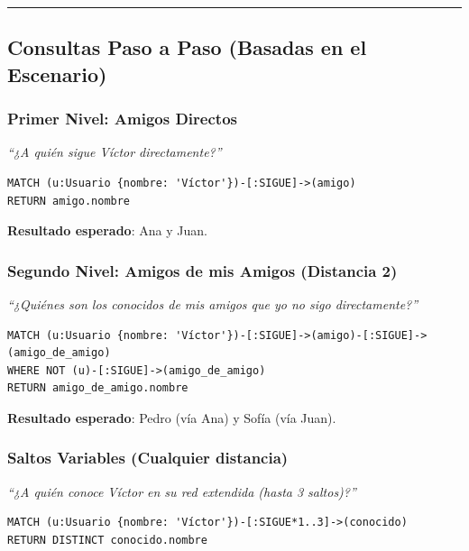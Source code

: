 \documentclass[12pt,a4paper]{article}
\begin{document}
\begin{center}\rule{0.5\linewidth}{0.5pt}\end{center}

\subsection{Consultas Paso a Paso (Basadas en el Escenario)}\label{consultas-paso-a-paso-basadas-en-el-escenario}

\subsubsection{Primer Nivel: Amigos Directos}\label{a.-primer-nivel-amigos-directos}

\emph{\enquote{¿A quién sigue Víctor directamente?}}

\begin{lstlisting}
MATCH (u:Usuario {nombre: 'Víctor'})-[:SIGUE]->(amigo)
RETURN amigo.nombre
\end{lstlisting}

\textbf{Resultado esperado}: Ana y Juan.

\subsubsection{Segundo Nivel: Amigos de mis Amigos (Distancia 2)}\label{b.-segundo-nivel-amigos-de-mis-amigos-distancia-2}

\emph{\enquote{¿Quiénes son los conocidos de mis amigos que yo no sigo directamente?}}

\begin{lstlisting}
MATCH (u:Usuario {nombre: 'Víctor'})-[:SIGUE]->(amigo)-[:SIGUE]->(amigo_de_amigo)
WHERE NOT (u)-[:SIGUE]->(amigo_de_amigo)
RETURN amigo_de_amigo.nombre
\end{lstlisting}

\textbf{Resultado esperado}: Pedro (vía Ana) y Sofía (vía Juan).

\subsubsection{Saltos Variables (Cualquier distancia)}\label{c.-saltos-variables-cualquier-distancia}

\emph{\enquote{¿A quién conoce Víctor en su red extendida (hasta 3 saltos)?}}

\begin{lstlisting}
MATCH (u:Usuario {nombre: 'Víctor'})-[:SIGUE*1..3]->(conocido)
RETURN DISTINCT conocido.nombre
\end{lstlisting}
\end{document}
